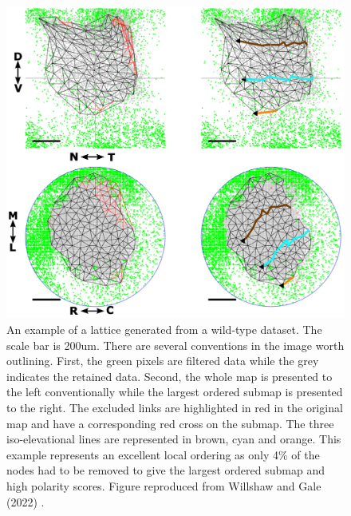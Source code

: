 \begin{figure}
	\centering
	\includegraphics[width=\textwidth]{images/lattice/figwt}
	\def\c{An example of a lattice generated from a wild-type dataset. }
	\caption[\c]{\label{fig:wild-type1}\c The scale bar is 200um. There are several conventions in the image worth outlining. First, the green pixels are filtered data while the grey indicates the retained data. Second, the whole map is presented to the left conventionally while the largest ordered submap is presented to the right. The excluded links are highlighted in red in the original map and have a corresponding red cross on the submap. The three iso-elevational lines are represented in brown, cyan and orange. This example represents an excellent local ordering as only 4\% of the nodes had to be removed to give the largest ordered submap and high polarity scores. Figure reproduced from Willshaw and Gale (2022) \cite{Willshaw2022-fs}.}	
\end{figure}


